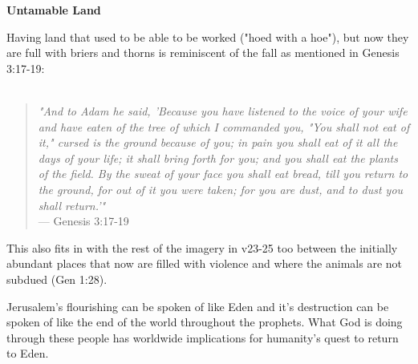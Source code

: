 \documentclass[11pt]{article}
\begin{document}
\newpage
{\large\bfseries Untamable Land}
\vspace{1em}

Having land that used to be able to be worked ("hoed with a hoe"), but now they are full with briers and thorns is reminiscent of the fall as mentioned in Genesis 3:17-19:
\\\\
\begin{quote}
\textit{"And to Adam he said, 'Because you have listened to the voice of your wife and have eaten of the tree of which I commanded you, "You shall not eat of it," cursed is the ground because of you; in pain you shall eat of it all the days of your life;  it shall bring forth for you; and you shall eat the plants of the field. By the sweat of your face you shall eat bread, till you return to the ground, for out of it you were taken; for you are dust, and to dust you shall return.'"} \\
\hfill --- Genesis 3:17-19
\end{quote}
\vspace{1em}

This also fits in with the rest of the imagery in v23-25 too between the initially abundant places that now are filled with violence and where the animals are not subdued (Gen 1:28).

Jerusalem's flourishing can be spoken of like Eden and it's destruction can be spoken of like the end of the world throughout the prophets. What God is doing through these people has worldwide implications for humanity's quest to return to Eden.
\end{document}
